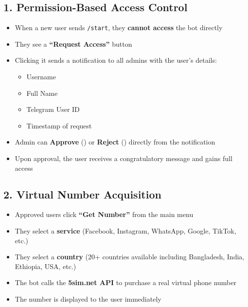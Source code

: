 \subsection{1. Permission-Based Access Control}
\begin{itemize}[leftmargin=2cm]
    \item[\ding{51}] When a new user sends \texttt{/start}, they \textbf{cannot access} the bot directly
    \item[\ding{51}] They see a \textbf{``Request Access''} button
    \item[\ding{51}] Clicking it sends a notification to all admins with the user's details:
    \begin{itemize}
        \item Username
        \item Full Name
        \item Telegram User ID
        \item Timestamp of request
    \end{itemize}
    \item[\ding{51}] Admin can \textbf{Approve} () or \textbf{Reject} () directly from the notification
    \item[\ding{51}] Upon approval, the user receives a congratulatory message and gains full access
\end{itemize}

\subsection{2. Virtual Number Acquisition}
\begin{itemize}[leftmargin=2cm]
    \item[\ding{51}] Approved users click \textbf{``Get Number''} from the main menu
    \item[\ding{51}] They select a \textbf{service} (Facebook, Instagram, WhatsApp, Google, TikTok, etc.)
    \item[\ding{51}] They select a \textbf{country} (20+ countries available including Bangladesh, India, Ethiopia, USA, etc.)
    \item[\ding{51}] The bot calls the \textbf{5sim.net API} to purchase a real virtual phone number
    \item[\ding{51}] The number is displayed to the user immediately
\end{itemize}

